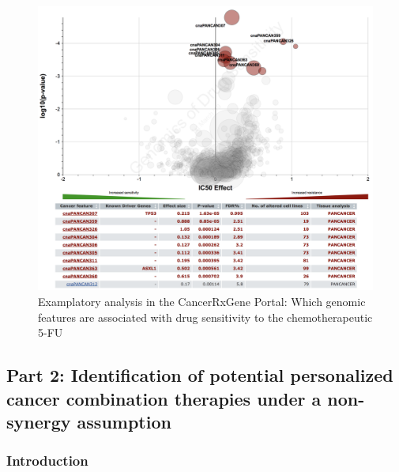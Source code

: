 \documentclass[]{article}
\begin{document}
\begin{figure}
\centering
\includegraphics{vulcano.png}
\caption{Examplatory analysis in the CancerRxGene Portal: Which genomic
features are associated with drug sensitivity to the chemotherapeutic
5-FU}
\end{figure}

\newpage

\hypertarget{part-2-identification-of-potential-personalized-cancer-combination-therapies-under-a-non-synergy-assumption}{%
\subsection{Part 2: Identification of potential personalized cancer
combination therapies under a non-synergy
assumption}\label{part-2-identification-of-potential-personalized-cancer-combination-therapies-under-a-non-synergy-assumption}}

\hypertarget{introduction-1}{%
\subsubsection{Introduction}\label{introduction-1}}
\end{document}

